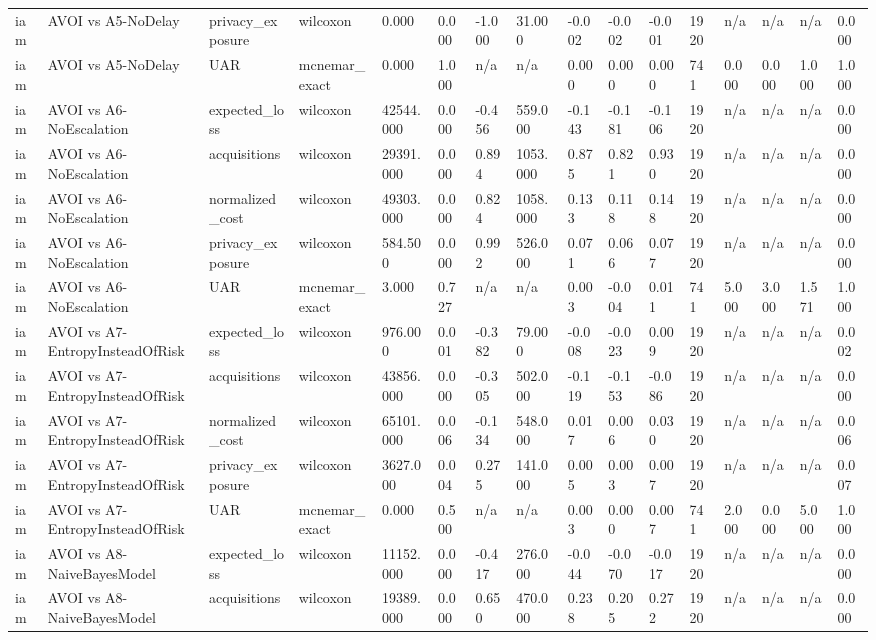 \begin{table}[!ht]
{\begin{tabular}{llllllllllllllll}
iam & AVOI vs A5-NoDelay & privacy\_exposure & wilcoxon & 0.000 & 0.000 & -1.000 & 31.000 & -0.002 & -0.002 & -0.001 & 1920 & n/a & n/a & n/a & 0.000 \\
iam & AVOI vs A5-NoDelay & UAR & mcnemar\_exact & 0.000 & 1.000 & n/a & n/a & 0.000 & 0.000 & 0.000 & 741 & 0.000 & 0.000 & 1.000 & 1.000 \\
iam & AVOI vs A6-NoEscalation & expected\_loss & wilcoxon & 42544.000 & 0.000 & -0.456 & 559.000 & -0.143 & -0.181 & -0.106 & 1920 & n/a & n/a & n/a & 0.000 \\
iam & AVOI vs A6-NoEscalation & acquisitions & wilcoxon & 29391.000 & 0.000 & 0.894 & 1053.000 & 0.875 & 0.821 & 0.930 & 1920 & n/a & n/a & n/a & 0.000 \\
iam & AVOI vs A6-NoEscalation & normalized\_cost & wilcoxon & 49303.000 & 0.000 & 0.824 & 1058.000 & 0.133 & 0.118 & 0.148 & 1920 & n/a & n/a & n/a & 0.000 \\
iam & AVOI vs A6-NoEscalation & privacy\_exposure & wilcoxon & 584.500 & 0.000 & 0.992 & 526.000 & 0.071 & 0.066 & 0.077 & 1920 & n/a & n/a & n/a & 0.000 \\
iam & AVOI vs A6-NoEscalation & UAR & mcnemar\_exact & 3.000 & 0.727 & n/a & n/a & 0.003 & -0.004 & 0.011 & 741 & 5.000 & 3.000 & 1.571 & 1.000 \\
iam & AVOI vs A7-EntropyInsteadOfRisk & expected\_loss & wilcoxon & 976.000 & 0.001 & -0.382 & 79.000 & -0.008 & -0.023 & 0.009 & 1920 & n/a & n/a & n/a & 0.002 \\
iam & AVOI vs A7-EntropyInsteadOfRisk & acquisitions & wilcoxon & 43856.000 & 0.000 & -0.305 & 502.000 & -0.119 & -0.153 & -0.086 & 1920 & n/a & n/a & n/a & 0.000 \\
iam & AVOI vs A7-EntropyInsteadOfRisk & normalized\_cost & wilcoxon & 65101.000 & 0.006 & -0.134 & 548.000 & 0.017 & 0.006 & 0.030 & 1920 & n/a & n/a & n/a & 0.006 \\
iam & AVOI vs A7-EntropyInsteadOfRisk & privacy\_exposure & wilcoxon & 3627.000 & 0.004 & 0.275 & 141.000 & 0.005 & 0.003 & 0.007 & 1920 & n/a & n/a & n/a & 0.007 \\
iam & AVOI vs A7-EntropyInsteadOfRisk & UAR & mcnemar\_exact & 0.000 & 0.500 & n/a & n/a & 0.003 & 0.000 & 0.007 & 741 & 2.000 & 0.000 & 5.000 & 1.000 \\
iam & AVOI vs A8-NaiveBayesModel & expected\_loss & wilcoxon & 11152.000 & 0.000 & -0.417 & 276.000 & -0.044 & -0.070 & -0.017 & 1920 & n/a & n/a & n/a & 0.000 \\
iam & AVOI vs A8-NaiveBayesModel & acquisitions & wilcoxon & 19389.000 & 0.000 & 0.650 & 470.000 & 0.238 & 0.205 & 0.272 & 1920 & n/a & n/a & n/a & 0.000 \\

\end{tabular}}
\end{table}
